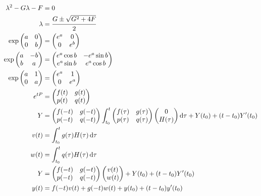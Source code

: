 \documentclass[12pt]{article}
\begin{document}
\begin{align}
\lambda^2 - G\lambda - F &= 0 \\
\lambda &= \cfrac{G \pm \sqrt{G^2 + 4F}}{2} \\
\exp \begin{pmatrix} a & 0 \\ 0 & b \end{pmatrix} &= \begin{pmatrix} e^a & 0 \\ 0 & e^b \end{pmatrix} \\
\exp \begin{pmatrix} a & -b \\ b & a \end{pmatrix} &= \begin{pmatrix} e^a\cos b & -e^a \sin b \\ e^a \sin b & e^a \cos b \end{pmatrix} \\
\exp \begin{pmatrix} a & 1 \\ 0 & a \end{pmatrix} &= \begin{pmatrix} e^a & 1 \\ 0 & e^a \end{pmatrix} \\
e^{tP} &= \begin{pmatrix} f(t) & g(t) \\ p(t) & q(t) \end{pmatrix} \\
 Y &= \begin{pmatrix} f(-t) & g(-t) \\ p(-t) & q(-t) \end{pmatrix} \int_{t_0}^t \begin{pmatrix} f(\tau) & g(\tau) \\ p(\tau) & q(\tau) \end{pmatrix} \begin{pmatrix} 0 \\ H(\tau) \end{pmatrix} \mathrm{d}\tau + Y(t_0) + (t-t_0) Y'(t_0) \\
 v(t) &= \int_{t_0}^t g(\tau) H(\tau) \,\mathrm{d}\tau \\
 w(t) &= \int_{t_0}^t q(\tau) H(\tau) \,\mathrm{d}\tau \\
 Y &= \begin{pmatrix} f(-t) & g(-t) \\ p(-t) & q(-t) \end{pmatrix}  \begin{pmatrix} v(t) \\ w(t) \end{pmatrix} + Y(t_0) + (t-t_0) Y'(t_0)  \\
 y(t) &= f(-t)v(t) + g(-t)w(t) + y(t_0) + (t-t_0) y'(t_0)
\end{align}
\end{document}

